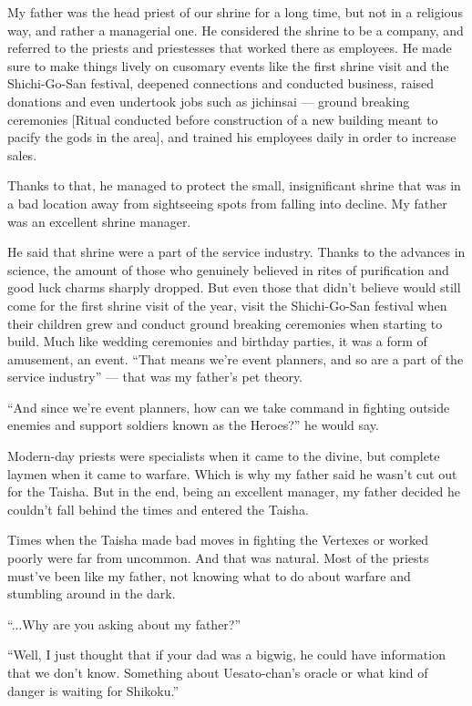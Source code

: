 My father was the head priest of our shrine for a long time, but not in a religious way, and rather a managerial one. He considered the shrine to be a company, and referred to the priests and priestesses that worked there as employees. He made sure to make things lively on cusomary events like the first shrine visit and the Shichi-Go-San festival, deepened connections and conducted business, raised donations and even undertook jobs such as jichinsai --- ground breaking ceremonies [Ritual conducted before construction of a new building meant to pacify the gods in the area], and trained his employees daily in order to increase sales.

Thanks to that, he managed to protect the small, insignificant shrine that was in a bad location away from sightseeing spots from falling into decline. My father was an excellent shrine manager.

He said that shrine were a part of the service industry. Thanks to the advances in science, the amount of those who genuinely believed in rites of purification and good luck charms sharply dropped. But even those that didn't believe would still come for the first shrine visit of the year, visit the Shichi-Go-San festival when their children grew and conduct ground breaking ceremonies when starting to build. Much like wedding ceremonies and birthday parties, it was a form of amusement, an event. ``That means we're event planners, and so are a part of the service industry'' --- that was my father's pet theory.

``And since we're event planners, how can we take command in fighting outside enemies and support soldiers known as the Heroes?'' he would say.

Modern-day priests were specialists when it came to the divine, but complete laymen when it came to warfare. Which is why my father said he wasn't cut out for the Taisha. But in the end, being an excellent manager, my father decided he couldn't fall behind the times and entered the Taisha.

Times when the Taisha made bad moves in fighting the Vertexes or worked poorly were far from uncommon. And that was natural. Most of the priests must've been like my father, not knowing what to do about warfare and stumbling around in the dark.

``...Why are you asking about my father?''

``Well, I just thought that if your dad was a bigwig, he could have information that we don't know. Something about Uesato-chan's oracle or what kind of danger is waiting for Shikoku.''

